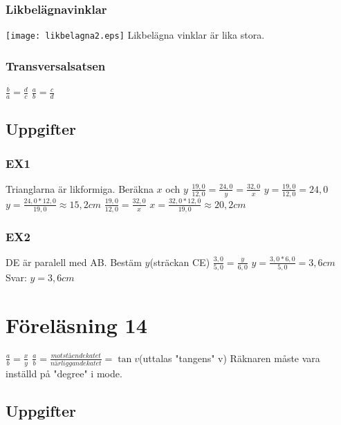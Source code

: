 \documentclass[a4paper,10pt]{article}
\begin{document}
\begin{flushleft}
    \subsubsection{Likbelägnavinklar}
      \texttt{[image: likbelagna2.eps]}\newline
      Likbelägna vinklar är lika stora.
    \subsubsection{Transversalsatsen}
      $ \frac{b}{a} = \frac{d}{c} $
      $ \frac{a}{b} = \frac{c}{d} $\newline
  \subsection{Uppgifter}
    \subsubsection{EX1}
      Trianglarna är likformiga. Beräkna $x$ och $y$
      $ \frac{19,0}{12,0} = \frac{24,0}{y} = \frac{32,0}{x} $\newline
      $ y = \frac{19,0}{12,0} = 24,0 $\newline
      $ y = \frac{24,0*12,0}{19,0}\approx15,2cm $\newline
      $ \frac{19,0}{12,0} = \frac{32,0}{x} $\newline
      $ x = \frac{32,0*12,0}{19,0}\approx20,2cm $\newline
    \subsubsection{EX2}
      DE är paralell med AB. Bestäm $y$(sträckan CE)
      $ \frac{3,0}{5,0} = \frac{y}{6,0} $\newline
      $ y = \frac{3,0*6,0}{5,0} = 3,6cm$\newline
      Svar: $ y = 3,6cm $
\section{Föreläsning 14}
  $ \frac{a}{b} = \frac{x}{y} $\newline
  $ \frac{a}{b} = \frac{motstående katet}{närliggande katet} = \tan v $(uttalas "tangens" v)\newline
  Räknaren måste vara inställd på "degree" i mode.\newline
  \subsection{Uppgifter}

\end{flushleft}
\end{document}
